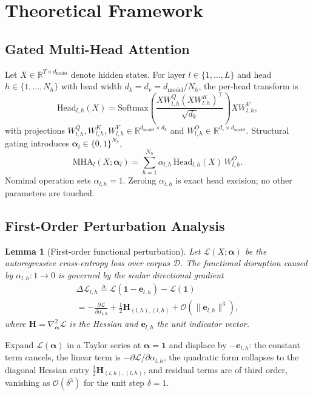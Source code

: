 \documentclass[10pt,journal,compsoc]{IEEEtran}
\newtheorem{lemma}{Lemma}
\begin{document}
\section{Theoretical Framework}
\subsection{Gated Multi-Head Attention}
Let $X\in\mathbb{R}^{T\times d_{\text{model}}}$ denote hidden states. For layer
$l\in\{1,\dots,L\}$ and head $h\in\{1,\dots,N_h\}$ with head width
$d_k=d_v=d_{\text{model}}/N_h$, the per-head transform is
\begin{equation}
\mathrm{Head}_{l,h}(X)=\mathrm{Softmax}\!\left(\frac{XW^{Q}_{l,h}(XW^{K}_{l,h})^{\top}}{\sqrt{d_k}}\right)XW^{V}_{l,h},
\label{eq:head}
\end{equation}
with projections $W^{Q}_{l,h},W^{K}_{l,h},W^{V}_{l,h}\in\mathbb{R}^{d_{\text{model}}\times d_k}$
and $W^{O}_{l,h}\in\mathbb{R}^{d_v\times d_{\text{model}}}$. Structural gating
introduces $\boldsymbol{\alpha}_l\in\{0,1\}^{N_h}$,
\begin{equation}
\mathrm{MHA}_l(X;\boldsymbol{\alpha}_l)=\sum_{h=1}^{N_h}\alpha_{l,h}\,
\mathrm{Head}_{l,h}(X)\,W^{O}_{l,h}.
\label{eq:gated}
\end{equation}
Nominal operation sets $\alpha_{l,h}=1$. Zeroing $\alpha_{l,h}$ is exact head
excision; no other parameters are touched.

\subsection{First-Order Perturbation Analysis}
\begin{lemma}[First-order functional perturbation]
\label{lemma:1}
Let $\mathcal{L}(X;\boldsymbol{\alpha})$ be the autoregressive cross-entropy loss
over corpus $\mathcal{D}$. The functional disruption caused by
$\alpha_{l,h}\colon 1\to 0$ is governed by the scalar directional gradient
\begin{multline}\Delta\mathcal{L}_{l,h}\triangleq\mathcal{L}(\mathbf{1}-\mathbf{e}_{l,h})-\mathcal{L}(\mathbf{1})
\\=-\frac{\partial\mathcal{L}}{\partial\alpha_{l,h}}
+\tfrac{1}{2}\mathbf{H}_{(l,h),(l,h)}+\mathcal{O}(\|\mathbf{e}_{l,h}\|^{3}),\end{multline}
where $\mathbf{H}=\nabla_{\boldsymbol{\alpha}}^{2}\mathcal{L}$ is the Hessian and
$\mathbf{e}_{l,h}$ the unit indicator vector.
\end{lemma}
\begin{IEEEproof}
Expand $\mathcal{L}(\boldsymbol{\alpha})$ in a Taylor series at
$\boldsymbol{\alpha}=\mathbf{1}$ and displace by $-\mathbf{e}_{l,h}$: the constant
term cancels, the linear term is $-\partial\mathcal{L}/\partial\alpha_{l,h}$, the
quadratic form collapses to the diagonal Hessian entry
$\tfrac12\mathbf{H}_{(l,h),(l,h)}$, and residual terms are of third order,
vanishing as $\mathcal{O}(\delta^{3})$ for the unit step $\delta=1$.
\end{IEEEproof}
\end{document}
